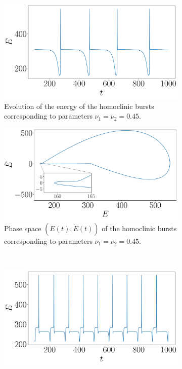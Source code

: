 \documentclass[twoside]{article}
\begin{document}
\begin{figure}[ht]
  \centering
  \begin{subfigure}[ht]{0.435\textwidth}
    \includegraphics[width=\textwidth]{images/homo_burst.pdf}
    \caption{Evolution of the energy of the homoclinic bursts corresponding to parameters $\nu_1=\nu_2=0.45$.}
  \end{subfigure}\hspace{0.04666\textwidth}
  \begin{subfigure}[ht]{0.435\textwidth}
    \includegraphics[width=\textwidth]{images/homo_burst_phase.pdf}
    \caption{Phase space $(E(t), \dot{E}(t))$ of the homoclinic bursts corresponding to parameters $\nu_1=\nu_2=0.45$.}
  \end{subfigure}\\
  \begin{subfigure}[ht]{0.435\textwidth}
    \includegraphics[width=\textwidth]{images/hetero_burst.pdf}

\end{subfigure}
\end{figure}
\end{document}
